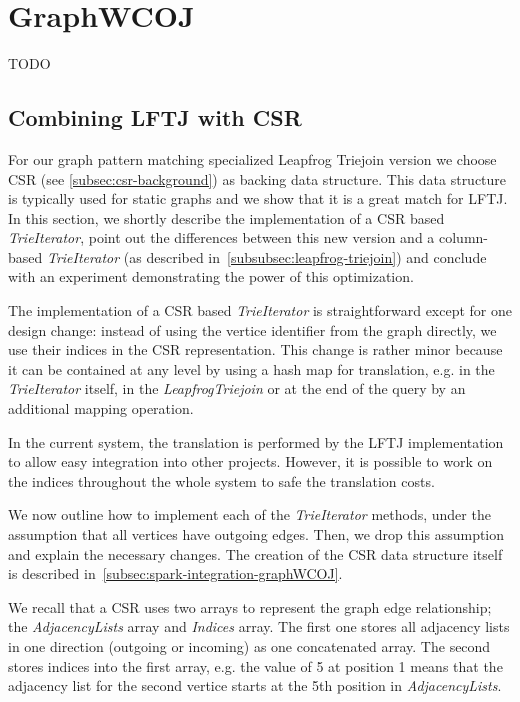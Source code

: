 \section{Graph\textsc{WCOJ}} \label{sec:graphwcoj}
TODO
\subsection{Combining \textsc{LFTJ} with \textsc{CSR}} \label{subsec:graphWCOJ-csr}
For our graph pattern matching specialized Leapfrog Triejoin version we choose \textsc{CSR} (see \cref{subsec:csr-background}) as
backing data structure.
This data structure is typically used for static graphs and we show that it is a great match for \textsc{LFTJ}.
In this section, we shortly describe the implementation of a \textsc{CSR} based \textit{TrieIterator}, point out the differences between
this new version and a column-based \textit{TrieIterator} (as described in~\cref{subsubsec:leapfrog-triejoin}) and conclude with an experiment demonstrating
the power of this optimization.

The implementation of a \textsc{CSR} based \textit{TrieIterator} is straightforward except for one design change: instead of using
the vertice identifier from the graph directly, we use their indices in the \textsc{CSR} representation.
This change is rather minor because it can be contained at any level by using a hash map for translation, e.g. in the
\textit{TrieIterator} itself, in the \textit{LeapfrogTriejoin} or at the end of the query by an additional mapping operation.

In the current system, the translation is performed by the \textsc{LFTJ} implementation to allow easy integration into other projects.
However, it is possible to work on the indices throughout the whole system to safe the translation costs.

We now outline how to implement each of the \textit{TrieIterator} methods, under the assumption that all vertices have outgoing edges.
Then, we drop this assumption and explain the necessary changes.
The creation of the \textsc{CSR} data structure itself is described in~\cref{subsec:spark-integration-graphWCOJ}.

We recall that a CSR uses two arrays to represent the graph edge relationship;
the \textit{AdjacencyLists} array and \textit{Indices} array.
The first one stores all adjacency lists in one direction (outgoing or incoming) as one concatenated array.
The second stores indices into the first array, e.g. the value of 5 at position 1 means that the adjacency list
for the second vertice starts at the 5th position in \textit{AdjacencyLists}.

